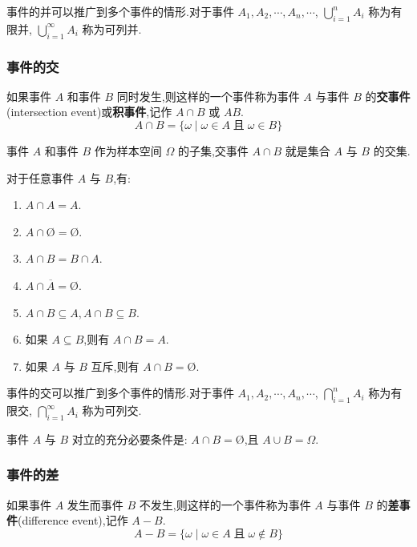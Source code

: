 事件的并可以推广到多个事件的情形.对于事件 $A_1,A_2,\cdots,A_n,\cdots$, $\displaystyle\bigcup_{i=1}^n A_i$ 称为有限并, $\displaystyle\bigcup_{i=1}^\infty A_i$ 称为可列并.

\subsubsection{事件的交}

如果事件 $A$ 和事件 $B$ 同时发生,则这样的一个事件称为事件 $A$ 与事件 $B$ 的\textbf{交事件}(intersection event)或\textbf{积事件},记作 $A \cap B$ 或 $AB$.
$$
A \cap B = \{ \omega \mid \omega \in A \;\text{且}\; \omega \in B \}
$$

事件 $A$ 和事件 $B$ 作为样本空间 $\varOmega$ 的子集,交事件 $A \cap B$ 就是集合 $A$ 与 $B$ 的交集.

\begin{property}
    \indent 对于任意事件 $A$ 与 $B$,有:
    \begin{enumerate}
        \item $A \cap A = A$.
        \item $A \cap \text{\O} = \text{\O}$.
        \item $A \cap B = B \cap A$.
        \item $A \cap \overline{A} = \text{\O}$.
        \item $A \cap B \subseteq A, A \cap B \subseteq B$.
        \item 如果 $A \subseteq B$,则有 $A \cap B = A$.
        \item 如果 $A$ 与 $B$ 互斥,则有 $A \cap B = \text{\O}$.
    \end{enumerate}
\end{property}

事件的交可以推广到多个事件的情形.对于事件 $A_1,A_2,\cdots,A_n,\cdots$, $\displaystyle\bigcap_{i=1}^n A_i$ 称为有限交, $\displaystyle\bigcap_{i=1}^\infty A_i$ 称为可列交.

\begin{conclusion}
    \indent 事件 $A$ 与 $B$ 对立的充分必要条件是: $A \cap B = \text{\O}$,且 $A \cup B = \varOmega$.
\end{conclusion}

\subsubsection{事件的差}

如果事件 $A$ 发生而事件 $B$ 不发生,则这样的一个事件称为事件 $A$ 与事件 $B$ 的\textbf{差事件}(difference event),记作 $A-B$.
$$
A - B = \{ \omega \mid \omega \in A \;\text{且}\; \omega \notin B \}
$$


